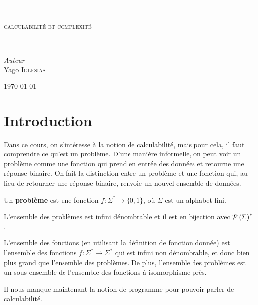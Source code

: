 \documentclass{article}
\begin{document}
\begin{titlepage}
	\newcommand{\HRule}{\rule{\linewidth}{0.5mm}}
	\center

	\HRule\\[0.4cm]

	\textsc{\Large calculabilité et complexité}\\[0.5cm]

	\HRule\\[1.5cm]

	{\large\textit{Auteur}}\\
	Yago \textsc{Iglesias}


	\vfill\vfill\vfill

	{\large\today}

	\vfill

\end{titlepage}

\tableofcontents

\section{Introduction}


Dans ce cours, on s'intéresse à la notion de calculabilité, mais pour cela, il faut comprendre ce qu'est un problème.
D'une manière informelle, on peut voir un problème comme une fonction qui prend en entrée des données et retourne une réponse binaire.
On fait la distinction entre un problème et une fonction qui, au lieu de retourner une réponse binaire, renvoie un nouvel ensemble de données.
\begin{definition}
	Un \textbf{problème} est une fonction $f: \Sigma^* \to \{0, 1\}$, où $\Sigma$ est un alphabet fini.
\end{definition}

\begin{remarque}
	L'ensemble des problèmes est infini dénombrable et il est en bijection avec $\mathcal{P}\left(\Sigma\right)^*$.
\end{remarque}

\begin{remarque}
	L'ensemble des fonctions (en utilisant la définition de fonction donnée) est l'ensemble des fonctions $f: \Sigma^* \to \Sigma^*$ qui est infini non dénombrable,
	et donc bien plus grand que l'ensemble des problèmes. De plus, l'ensemble des problèmes est un sous-ensemble de l'ensemble des fonctions à isomorphisme près.
\end{remarque}

Il nous manque maintenant la notion de programme pour pouvoir parler de calculabilité.
\end{document}
